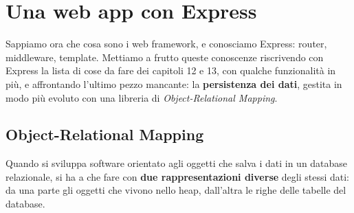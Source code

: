 \chapter{Una web app con Express}

Sappiamo ora che cosa sono i web framework, e conosciamo Express: router,
middleware, template. Mettiamo a frutto queste conoscenze riscrivendo con
Express la lista di cose da fare dei capitoli 12 e 13, con qualche funzionalità
in più, e affrontando l'ultimo pezzo mancante: la \textbf{persistenza dei
dati}, gestita in modo più evoluto con una libreria di \textit{Object-Relational
Mapping}.

\section{Object-Relational Mapping}

Quando si sviluppa software orientato agli oggetti che salva i dati in un
database relazionale, si ha a che fare con \textbf{due rappresentazioni diverse}
degli stessi dati: da una parte gli oggetti che vivono nello heap, dall'altra le
righe delle tabelle del database.

